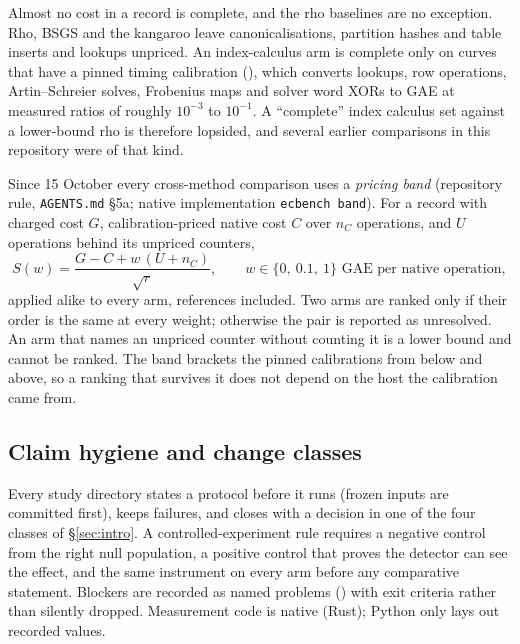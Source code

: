 Almost no cost in a record is complete, and the rho baselines are no
exception. Rho, BSGS and the kangaroo leave canonicalisations, partition
hashes and table inserts and lookups unpriced. An index-calculus arm is
complete only on curves that have a pinned timing calibration
(), which converts lookups, row operations,
Artin--Schreier solves, Frobenius maps and solver word XORs to GAE at
measured ratios of roughly $10^{-3}$ to $10^{-1}$. A ``complete'' index
calculus set against a lower-bound rho is therefore lopsided, and several
earlier comparisons in this repository were of that kind.

Since 15 October every cross-method comparison uses a \emph{pricing band}
(repository rule, \texttt{AGENTS.md} \S5a; native implementation
\texttt{ecbench band}). For a record with charged cost $G$, calibration-priced
native cost $C$ over $n_C$ operations, and $U$ operations behind its
unpriced counters,
\[
  S(w)=\frac{G-C+w\,(U+n_C)}{\sqrt r},\qquad w\in\{0,\ 0.1,\ 1\}
  \text{ GAE per native operation},
\]
applied alike to every arm, references included. Two arms are ranked only
if their order is the same at every weight; otherwise the pair is reported
as unresolved. An arm that names an unpriced counter without counting it is
a lower bound and cannot be ranked. The band brackets the pinned
calibrations from below and above, so a ranking that survives it does not
depend on the host the calibration came from.

\subsection{Claim hygiene and change classes}

Every study directory states a protocol before it runs (frozen inputs are
committed first), keeps failures, and closes with a decision in one of the
four classes of \S\ref{sec:intro}. A controlled-experiment rule requires a
negative control from the right null population, a positive control that
proves the detector can see the effect, and the same instrument on every
arm before any comparative statement. Blockers are recorded as named
problems () with exit criteria rather than silently dropped.
Measurement code is native (Rust); Python only lays out recorded values.

